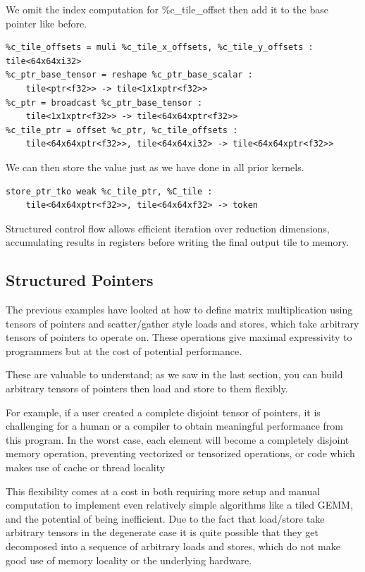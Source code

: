 \documentclass{article}
\begin{document}
We omit the index computation for \%c\_tile\_offset then add it to the base pointer like before.


\begin{lstlisting}
%c_tile_offsets = muli %c_tile_x_offsets, %c_tile_y_offsets : tile<64x64xi32>
%c_ptr_base_tensor = reshape %c_ptr_base_scalar :
    tile<ptr<f32>> -> tile<1x1xptr<f32>>
%c_ptr = broadcast %c_ptr_base_tensor :
    tile<1x1xptr<f32>> -> tile<64x64xptr<f32>>
%c_tile_ptr = offset %c_ptr, %c_tile_offsets :
    tile<64x64xptr<f32>>, tile<64x64xi32> -> tile<64x64xptr<f32>>
\end{lstlisting}

We can then store the value just as we have done in all prior kernels.


\begin{lstlisting}
store_ptr_tko weak %c_tile_ptr, %C_tile :
    tile<64x64xptr<f32>>, tile<64x64xf32> -> token
\end{lstlisting}

Structured control flow allows efficient iteration over reduction dimensions, accumulating results in registers before writing the final output tile to memory.



\subsection{Structured Pointers}

The previous examples have looked at how to define matrix multiplication using tensors of pointers and scatter/gather style loads and stores, which take arbitrary tensors of pointers to operate on. These operations give maximal expressivity to programmers but at the cost of potential performance.


These are valuable to understand; as we saw in the last section, you can build arbitrary tensors of pointers then load and store to them flexibly.


For example, if a user created a complete disjoint tensor of pointers, it is challenging for a human or a compiler to obtain meaningful performance from this program. In the worst case, each element will become a completely disjoint memory operation, preventing vectorized or tensorized operations, or code which makes use of cache or thread locality


This flexibility comes at a cost in both requiring more setup and manual computation to implement even relatively simple algorithms like a tiled GEMM, and the potential of being inefficient. Due to the fact that load/store take arbitrary tensors in the degenerate case it is quite possible that they get decomposed into a sequence of arbitrary loads and stores, which do not make good use of memory locality or the underlying hardware.
\end{document}
